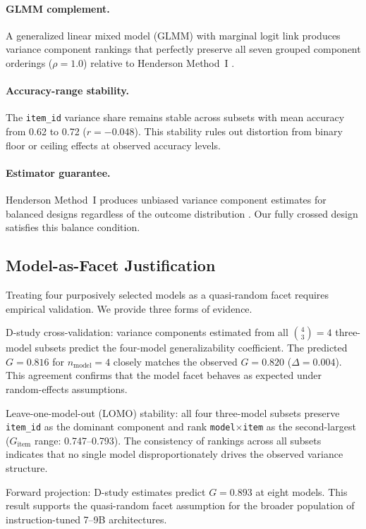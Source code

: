 \paragraph{GLMM complement.} A generalized linear mixed model (GLMM) with marginal logit link produces variance component rankings that perfectly preserve all seven grouped component orderings ($\rho = 1.0$) relative to Henderson Method~I \cite{jiang2018bayesian, tuerlinckx2006glmm}.

\paragraph{Accuracy-range stability.} The \texttt{item\_id} variance share remains stable across subsets with mean accuracy from 0.62 to 0.72 ($r = -0.048$). This stability rules out distortion from binary floor or ceiling effects at observed accuracy levels.

\paragraph{Estimator guarantee.} Henderson Method~I produces unbiased variance component estimates for balanced designs regardless of the outcome distribution \cite[Ch.~12]{brennan2001generalizability}. Our fully crossed design satisfies this balance condition.

\subsection{Model-as-Facet Justification}
\label{sec:model_facet}

Treating four purposively selected models as a quasi-random facet requires empirical validation. We provide three forms of evidence.

D-study cross-validation: variance components estimated from all $\binom{4}{3} = 4$ three-model subsets predict the four-model generalizability coefficient. The predicted $G = 0.816$ for $n_\text{model} = 4$ closely matches the observed $G = 0.820$ ($\Delta = 0.004$). This agreement confirms that the model facet behaves as expected under random-effects assumptions.

Leave-one-model-out (LOMO) stability: all four three-model subsets preserve \texttt{item\_id} as the dominant component and rank \texttt{model$\times$item} as the second-largest ($G_\text{item}$ range: 0.747--0.793). The consistency of rankings across all subsets indicates that no single model disproportionately drives the observed variance structure.

Forward projection: D-study estimates predict $G = 0.893$ at eight models. This result supports the quasi-random facet assumption for the broader population of instruction-tuned 7--9B architectures.

